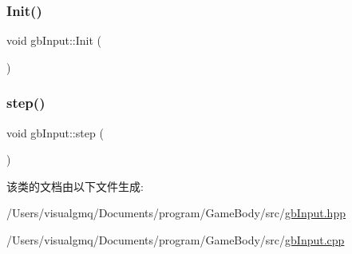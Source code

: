 \subsubsection{\texorpdfstring{Init()}{Init()}}
{\footnotesize\ttfamily void gb\+Input\+::\+Init (\begin{DoxyParamCaption}{ }\end{DoxyParamCaption})\hspace{0.3cm}{\ttfamily [static]}}

\mbox{\label{classgb_input_ac294faea739dc21a97cd651208bbeb29}} 
\subsubsection{\texorpdfstring{step()}{step()}}
{\footnotesize\ttfamily void gb\+Input\+::step (\begin{DoxyParamCaption}{ }\end{DoxyParamCaption})\hspace{0.3cm}{\ttfamily [static]}}



该类的文档由以下文件生成\+:\begin{DoxyCompactItemize}
\item 
/\+Users/visualgmq/\+Documents/program/\+Game\+Body/src/\mbox{\hyperlink{gb_input_8hpp}{gb\+Input.\+hpp}}\item 
/\+Users/visualgmq/\+Documents/program/\+Game\+Body/src/\mbox{\hyperlink{gb_input_8cpp}{gb\+Input.\+cpp}}\end{DoxyCompactItemize}
